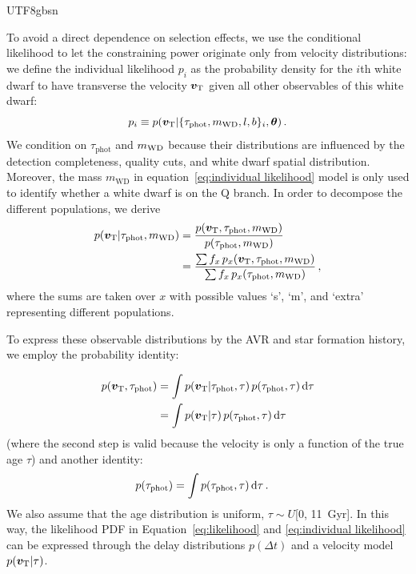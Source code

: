 \documentclass[twocolumn, times, trackchanges]{aastex63_bren}
\newcommand{\mathbfit}{\bm}
\newcommand{\bvT}{\mathbfit{v}_{\rm T}}
\begin{document}
\begin{CJK*}{UTF8}{gbsn}
\begin{appendix}
To avoid a direct dependence on selection effects, we use the conditional likelihood to let the constraining power originate only from velocity distributions: we define the individual likelihood $p_i$ as the probability density for the $i$th white dwarf to have transverse the velocity $\bvT$ given all other observables of this white dwarf:
\begin{equation}
\label{eq:individual likelihood}
    p_i \equiv p(\bvT|\{\tau_\text{phot},m_{\rm{WD}},l,b\}_i, \bm{\theta})\,.
\end{equation}
We condition on $\tau_\text{phot}$ and $m_{\rm{WD}}$ because their distributions are influenced by the detection completeness, quality cuts, and white dwarf spatial distribution. Moreover, the mass $m_\text{WD}$ in equation~\ref{eq:individual likelihood} model is only used to identify whether a white dwarf is on the Q branch. In order to decompose the different populations, we derive
\begin{align}
\label{eq:conditional}
    \nonumber p(\bvT|\tau_\text{phot},m_\text{WD})&=\frac{p(\bvT,\tau_\text{phot},m_\text{WD})}{p(\tau_\text{phot},m_\text{WD})}\\
    &=\frac{\sum f_x\,p_x(\bvT,\tau_\text{phot},m_\text{WD}) }{\sum f_x\,p_x(\tau_\text{phot},m_\text{WD})}\,,
\end{align}
where the sums are taken over $x$ with possible values `s', `m', and `extra' representing different populations.

To express these observable distributions by the AVR and star formation history, we employ the probability identity:

\begin{align}
    \nonumber p(\bvT,\tau_\text{phot})&=\int{p(\bvT|\tau_\text{phot},\tau)\, p(\tau_\text{phot},\tau)\,{\rm d}\tau}\\
    &=\int{p(\bvT|\tau)\,p(\tau_\text{phot},\tau)\,{\rm d}\tau}\,
\end{align}
(where the second step is valid because the velocity is only a function of the true age $\tau$) and another identity:
\begin{align}
    p(\tau_\text{phot})&=\int{p(\tau_\text{phot},\tau)\,{\rm d}\tau}\,.
\end{align}
We also assume that the age distribution is uniform, $\tau\sim U$[0, 11~Gyr]. In this way, the likelihood PDF in Equation~\ref{eq:likelihood} and \ref{eq:individual likelihood} can be expressed through the delay distributions $p(\Delta t)$ and a velocity model $p(\bvT|\tau)$.


\end{appendix}
\end{CJK*}
\end{document}
